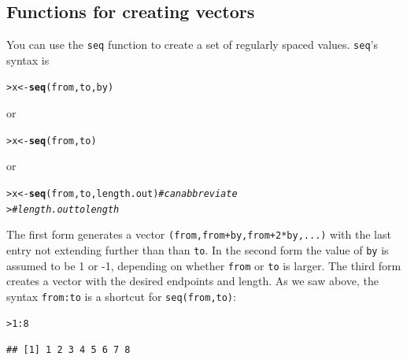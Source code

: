 \documentclass[11pt]{article}\usepackage[]{graphicx}\usepackage[]{color}
\makeatletter
\newcommand{\hlnum}[1]{\textcolor[rgb]{0.686,0.059,0.569}{#1}}%
\newcommand{\hlcom}[1]{\textcolor[rgb]{0.678,0.584,0.686}{\textit{#1}}}%
\newcommand{\hlopt}[1]{\textcolor[rgb]{0,0,0}{#1}}%
\newcommand{\hlstd}[1]{\textcolor[rgb]{0.345,0.345,0.345}{#1}}%
\newcommand{\hlkwb}[1]{\textcolor[rgb]{0.69,0.353,0.396}{#1}}%
\newcommand{\hlkwd}[1]{\textcolor[rgb]{0.737,0.353,0.396}{\textbf{#1}}}%
\newenvironment{kframe}{%
 \def\at@end@of@kframe{}%
 \ifinner\ifhmode%
  \def\at@end@of@kframe{\end{minipage}}%
  \begin{minipage}{\columnwidth}%
 \fi\fi%
 \def\FrameCommand##1{\hskip\@totalleftmargin \hskip-\fboxsep
 \colorbox{shadecolor}{##1}\hskip-\fboxsep
     \hskip-\linewidth \hskip-\@totalleftmargin \hskip\columnwidth}%
 \MakeFramed {\advance\hsize-\width
   \@totalleftmargin\z@ \linewidth\hsize
   \@setminipage}}%
 {\par\unskip\endMakeFramed%
 \at@end@of@kframe}
\newenvironment{knitrout}{}{} %
\newcommand{\code}[1]{{\tt #1}}
\numberwithin{exercise}{section}
\makeatother
\begin{document}
\subsection{Functions for creating vectors}
You can use the \code{seq} function to 
create a set of regularly spaced values.
\code{seq}'s syntax is 
\begin{knitrout}
\color{fgcolor}\begin{kframe}
\begin{alltt}
\hlstd{> }\hlstd{x} \hlkwb{<-} \hlkwd{seq}\hlstd{(from, to, by)}
\end{alltt}
\end{kframe}
\end{knitrout}
\noindent or 
\begin{knitrout}
\color{fgcolor}\begin{kframe}
\begin{alltt}
\hlstd{> }\hlstd{x} \hlkwb{<-} \hlkwd{seq}\hlstd{(from, to)}
\end{alltt}
\end{kframe}
\end{knitrout}
\noindent or
\begin{knitrout}
\color{fgcolor}\begin{kframe}
\begin{alltt}
\hlstd{> }\hlstd{x} \hlkwb{<-} \hlkwd{seq}\hlstd{(from, to, length.out)} \hlcom{# can abbreviate }
\hlstd{> }                               \hlcom{# length.out to length}
\end{alltt}
\end{kframe}
\end{knitrout}
\noindent The first form generates a vector
\code{(from,from+by,from+2*by,...)}  with the last entry not extending
further than than \code{to}.  In the second form the value of
\code{by} is assumed to be 1 or -1, depending on whether \code{from}
or \code{to} is larger.  The third form creates a vector with the
desired endpoints and length.  As we saw above, the syntax
\code{from:to} is a shortcut for \code{seq(from,to)}:
\begin{knitrout}
\color{fgcolor}\begin{kframe}
\begin{alltt}
\hlstd{> }\hlnum{1}\hlopt{:}\hlnum{8}
\end{alltt}
\begin{verbatim}
## [1] 1 2 3 4 5 6 7 8
\end{verbatim}
\end{kframe}
\end{knitrout}
\end{document}
